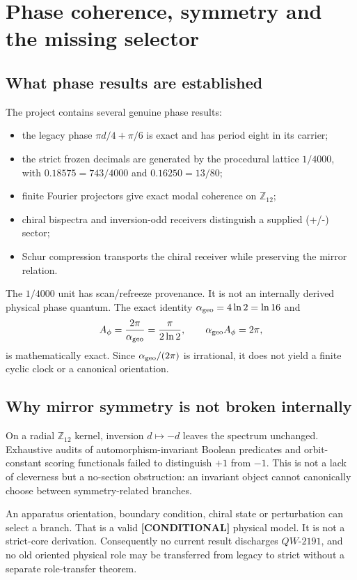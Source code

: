 \documentclass[11pt,a4paper]{article}
\theoremstyle{definition}
\theoremstyle{remark}
\newcommand{\Z}{\mathbb Z}
\newcommand{\status}[2]{\textcolor{#1}{\textbf{[#2]}}}
\newcommand{\conditional}{\status{fingray}{CONDITIONAL}}
\begin{document}
\section{Phase coherence, symmetry and the missing selector}

\subsection{What phase results are established}

The project contains several genuine phase results:

\begin{itemize}
\item the legacy phase $\pi d/4+\pi/6$ is exact and has period eight in its carrier;
\item the strict frozen decimals are generated by the procedural lattice $1/4000$, with $0.18575=743/4000$ and $0.16250=13/80$;
\item finite Fourier projectors give exact modal coherence on $\Z_{12}$;
\item chiral bispectra and inversion-odd receivers distinguish a supplied (+/-) sector;
\item Schur compression transports the chiral receiver while preserving the mirror relation.
\end{itemize}

The $1/4000$ unit has scan/refreeze provenance. It is not an internally derived physical phase quantum. The exact identity $\alpha_{\rm geo}=4\ln2=\ln16$ and
\[
A_\phi=\frac{2\pi}{\alpha_{\rm geo}}=\frac{\pi}{2\ln2},\qquad
\alpha_{\rm geo}A_\phi=2\pi,
\]
is mathematically exact. Since $\alpha_{\rm geo}/(2\pi)$ is irrational, it does not yield a finite cyclic clock or a canonical orientation.

\subsection{Why mirror symmetry is not broken internally}

On a radial $\Z_{12}$ kernel, inversion $d\mapsto-d$ leaves the spectrum unchanged. Exhaustive audits of automorphism-invariant Boolean predicates and orbit-constant scoring functionals failed to distinguish $+1$ from $-1$. This is not a lack of cleverness but a no-section obstruction: an invariant object cannot canonically choose between symmetry-related branches.

An apparatus orientation, boundary condition, chiral state or perturbation can select a branch. That is a valid \conditional{} physical model. It is not a strict-core derivation. Consequently no current result discharges $QW\text{-}2191$, and no old oriented physical role may be transferred from legacy to strict without a separate role-transfer theorem.
\end{document}
